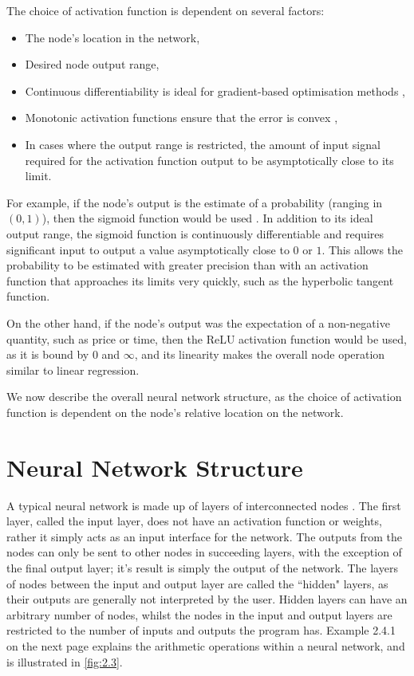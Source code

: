 \documentclass[honours,12pt]{unswthesis}
\numberwithin{equation}{section}
\theoremstyle{definition}
\begin{document}
\newpage
The choice of activation function is dependent on several factors:
\begin{itemize}
\item The node's location in the network,
\item Desired node output range,
\item Continuous differentiability is ideal for gradient-based optimisation methods \citep{snyman},
\item Monotonic activation functions ensure that the error is convex \citep{wu},
\item In cases where the output range is restricted, the amount of input signal required for the activation function output to be asymptotically close to its limit.
\end{itemize}

For example, if the node's output is the estimate of a probability (ranging in $(0,1)$), then the sigmoid function would be used \citep{cybenko}. In addition to its ideal output range, the sigmoid function is continuously differentiable and requires significant input to output a value asymptotically close to $0$ or $1$. This allows the probability to be estimated with greater precision than with an activation function that approaches its limits very quickly, such as the hyperbolic tangent function.

On the other hand, if the node's output was the expectation of a non-negative quantity, such as price or time, then the ReLU activation function would be used, as it is bound by $0$ and $\infty$, and its linearity makes the overall node operation similar to linear regression.

We now describe the overall neural network structure, as the choice of activation function is dependent on the node's relative location on the network.
\section{Neural Network Structure}\label{sec:2.4}
A typical neural network is made up of layers of interconnected nodes \citep{neuralstat}. The first layer, called the input layer, does not have an activation function or weights, rather it simply acts as an input interface for the network. The outputs from the nodes can only be sent to other nodes in succeeding layers, with the exception of the final output layer; it's result is simply the output of the network. The layers of nodes between the input and output layer are called the ``hidden" layers, as their outputs are generally not interpreted by the user. Hidden layers can have an arbitrary number of nodes, whilst the nodes in the input and output layers are restricted to the number of inputs and outputs the program has. Example 2.4.1 on the next page explains the arithmetic operations within a neural network, and is illustrated in \autoref{fig:2.3}.
\end{document}
